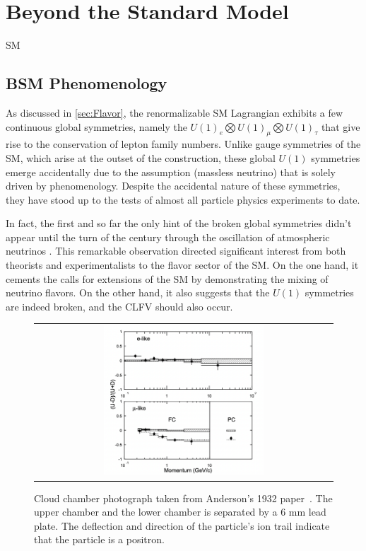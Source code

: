 \chapter{Beyond the Standard Model}
\label{chap:BSM}

\ac{SM}

\section{BSM Phenomenology}

As discussed in \autoref{sec:Flavor}, the renormalizable \ac{SM} Lagrangian exhibits a few continuous global symmetries, namely the $U(1)_{e}\bigotimes U(1)_{\mu}\bigotimes U(1)_{\tau}$ that give rise to the conservation of lepton family numbers. Unlike gauge symmetries of the \ac{SM}, which arise at the outset of the construction, these global $U(1)$ symmetries emerge accidentally due to the assumption (massless neutrino) that is solely driven by phenomenology. Despite the accidental nature of these symmetries, they have stood up to the tests of almost all particle physics experiments to date.  

In fact, the first and so far the only hint of the broken global symmetries didn't appear until the turn of the century through the oscillation of atmospheric neutrinos \cite{Super-Kamiokande:1998kpq,SNO:2002tuh}. This remarkable observation directed significant interest from both theorists and experimentalists to the flavor sector of the \ac{SM}. On the one hand, it cements the calls for extensions of the \ac{SM} by demonstrating the mixing of neutrino flavors. On the other hand, it also suggests that the $U(1)$ symmetries are indeed broken, and the \ac{CLFV} should also occur. 

\begin{figure}[tbh!]
 \begin{center}
 \begin{tabular}{c}
 \includegraphics[width=0.55\textwidth]{figures/Part1/BSM/SuperK}
 \end{tabular}
 \caption{Cloud chamber photograph taken from Anderson's 1932 paper~\cite{Super-Kamiokande:1998kpq}. The upper chamber and the lower chamber is separated by a 6 mm lead plate. The deflection and direction of the particle's ion trail indicate that the particle is a positron.}
 \label{fig:Positron}
 \end{center}
\end{figure}

